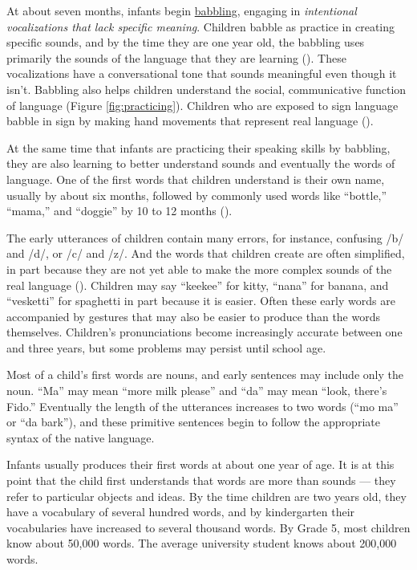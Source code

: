 \documentclass[
]{krantz}
\begin{document}
At about seven months, infants begin \hyperref[babbling]{babbling}, engaging in \emph{intentional vocalizations that lack specific meaning}. Children babble as practice in creating specific sounds, and by the time they are one year old, the babbling uses primarily the sounds of the language that they are learning (). These vocalizations have a conversational tone that sounds meaningful even though it isn't. Babbling also helps children understand the social, communicative function of language (Figure \ref{fig:practicing}). Children who are exposed to sign language babble in sign by making hand movements that represent real language ().

At the same time that infants are practicing their speaking skills by babbling, they are also learning to better understand sounds and eventually the words of language. One of the first words that children understand is their own name, usually by about six months, followed by commonly used words like ``bottle,'' ``mama,'' and ``doggie'' by 10 to 12 months ().

The early utterances of children contain many errors, for instance, confusing /b/ and /d/, or /c/ and /z/. And the words that children create are often simplified, in part because they are not yet able to make the more complex sounds of the real language (). Children may say ``keekee'' for kitty, ``nana'' for banana, and ``vesketti'' for spaghetti in part because it is easier. Often these early words are accompanied by gestures that may also be easier to produce than the words themselves. Children's pronunciations become increasingly accurate between one and three years, but some problems may persist until school age.

Most of a child's first words are nouns, and early sentences may include only the noun. ``Ma'' may mean ``more milk please'' and ``da'' may mean ``look, there's Fido.'' Eventually the length of the utterances increases to two words (``mo ma'' or ``da bark''), and these primitive sentences begin to follow the appropriate syntax of the native language.

Infants usually produces their first words at about one year of age. It is at this point that the child first understands that words are more than sounds --- they refer to particular objects and ideas. By the time children are two years old, they have a vocabulary of several hundred words, and by kindergarten their vocabularies have increased to several thousand words. By Grade 5, most children know about 50,000 words. The average university student knows about 200,000 words.
\end{document}
